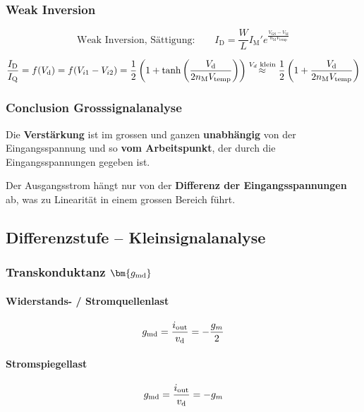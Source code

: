 \subsubsection{Weak Inversion}

\vspace{-0.2cm}

\[
    \text{Weak Inversion, Sättigung:} \qquad I_\text{D} = \frac{W}{L} I_\text{M}' e^\frac{V_\text{GS}-V_\text{M}}{n_\text{M} V_\text{temp}}
\]

\vspace{-0.2cm}

\[
    \frac{I_\text{D}}{I_\text{Q}} = f(V_{\rm d}) = f(V_{i1} - V_{i2}) = \frac{1}{2} \left(1 + \tanh \left( \frac{V_\text{d}}{2 n_\text{M} V_\text{temp}} \right) \right)
     \overset{V_d \text{ klein}}{\approx} \frac{1}{2} \left(1+\frac{V_\text{d}}{2 n_\text{M} V_\text{temp}}\right)
\]


\subsubsection{Conclusion Grosssignalanalyse}

Die \textbf{Verstärkung} ist im grossen und ganzen \textbf{unabhängig} von der Eingangsspannung und so \textbf{vom Arbeitspunkt}, der durch die Eingangsspannungen gegeben ist.

\smallskip

Der Ausgangsstrom hängt nur von der \textbf{Differenz der Eingangsspannungen} ab, was zu Linearität in einem grossen Bereich führt.


\subsection{Differenzstufe -- Kleinsignalanalyse}

\subsubsection{Transkonduktanz $\bm{g_{\rm md}}$}

\begin{minipage}[t]{0.48\columnwidth}
    \paragraph{Widerstands- / Stromquellenlast}

    \[
        g_{\rm md} = \frac{i_{\rm out}}{v_{\rm d}} = - \frac{g_m}{2}
    \]
\end{minipage}
\hfill
\begin{minipage}[t]{0.48\columnwidth}
    \paragraph{Stromspiegellast}

    \[
        g_{\rm md} = \frac{i_{\rm out}}{v_{\rm d}} = - g_m
    \]
\end{minipage}


